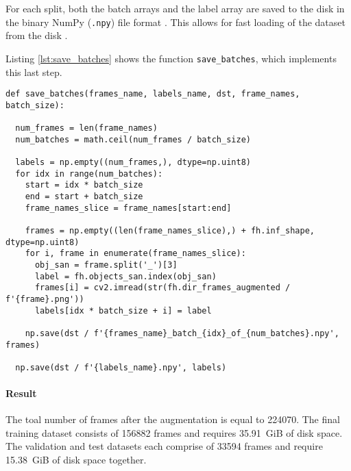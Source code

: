 For each split, both the batch arrays and the label array are saved to the disk in the binary NumPy (\texttt{.npy}) file format \cite{}. %
This allows for fast loading of the dataset from the disk \cite{}. %

Listing \ref{lst:save_batches} shows the function \texttt{save\_batches}, which implements this last step.

\begin{lstlisting}[style=python, caption={Python function \texttt{save\_batches} to save the batch arrays and the label array}, label=lst:save_batches]
def save_batches(frames_name, labels_name, dst, frame_names, batch_size):

  num_frames = len(frame_names)
  num_batches = math.ceil(num_frames / batch_size)

  labels = np.empty((num_frames,), dtype=np.uint8)
  for idx in range(num_batches):
    start = idx * batch_size
    end = start + batch_size
    frame_names_slice = frame_names[start:end]

    frames = np.empty((len(frame_names_slice),) + fh.inf_shape, dtype=np.uint8)
    for i, frame in enumerate(frame_names_slice):
      obj_san = frame.split('_')[3]
      label = fh.objects_san.index(obj_san)
      frames[i] = cv2.imread(str(fh.dir_frames_augmented / f'{frame}.png'))
      labels[idx * batch_size + i] = label

    np.save(dst / f'{frames_name}_batch_{idx}_of_{num_batches}.npy', frames)

  np.save(dst / f'{labels_name}.npy', labels)
\end{lstlisting}

\paragraph{Result}
The toal number of frames after the augmentation is equal to \num{224070}.
The final training dataset consists of \num{156882} frames and requires \SI{35.91}{GiB} of disk space.
The validation and test datasets each comprise of \num{33594} frames and require \SI{15.38}{GiB} of disk space together.




